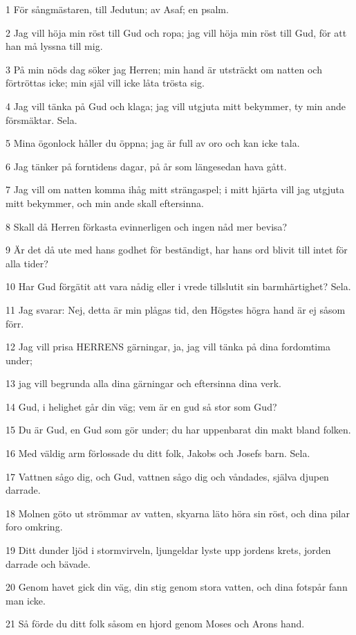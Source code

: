 \par 1 För sångmästaren, till Jedutun; av Asaf; en psalm.
\par 2 Jag vill höja min röst till Gud och ropa; jag vill höja min röst till Gud, för att han må lyssna till mig.
\par 3 På min nöds dag söker jag Herren; min hand är utsträckt om natten och förtröttas icke; min själ vill icke låta trösta sig.
\par 4 Jag vill tänka på Gud och klaga; jag vill utgjuta mitt bekymmer, ty min ande försmäktar. Sela.
\par 5 Mina ögonlock håller du öppna; jag är full av oro och kan icke tala.
\par 6 Jag tänker på forntidens dagar, på år som längesedan hava gått.
\par 7 Jag vill om natten komma ihåg mitt strängaspel; i mitt hjärta vill jag utgjuta mitt bekymmer, och min ande skall eftersinna.
\par 8 Skall då Herren förkasta evinnerligen och ingen nåd mer bevisa?
\par 9 Är det då ute med hans godhet för beständigt, har hans ord blivit till intet för alla tider?
\par 10 Har Gud förgätit att vara nådig eller i vrede tillslutit sin barmhärtighet? Sela.
\par 11 Jag svarar: Nej, detta är min plågas tid, den Högstes högra hand är ej såsom förr.
\par 12 Jag vill prisa HERRENS gärningar, ja, jag vill tänka på dina fordomtima under;
\par 13 jag vill begrunda alla dina gärningar och eftersinna dina verk.
\par 14 Gud, i helighet går din väg; vem är en gud så stor som Gud?
\par 15 Du är Gud, en Gud som gör under; du har uppenbarat din makt bland folken.
\par 16 Med väldig arm förlossade du ditt folk, Jakobs och Josefs barn. Sela.
\par 17 Vattnen sågo dig, och Gud, vattnen sågo dig och våndades, själva djupen darrade.
\par 18 Molnen göto ut strömmar av vatten, skyarna läto höra sin röst, och dina pilar foro omkring.
\par 19 Ditt dunder ljöd i stormvirveln, ljungeldar lyste upp jordens krets, jorden darrade och bävade.
\par 20 Genom havet gick din väg, din stig genom stora vatten, och dina fotspår fann man icke.
\par 21 Så förde du ditt folk såsom en hjord genom Moses och Arons hand.

